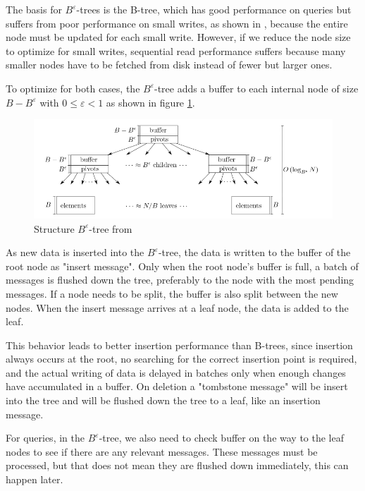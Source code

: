 \documentclass[
	12pt,
	a4paper,
	abstract,
	bibliography=totoc,
	chapterprefix,
	headings=openright,
	numbers=endperiod,
	parskip=half,
	twoside,
]{scrreprt}
\begin{document}
The basis for $B^{\varepsilon}$-trees is the B-tree, which has good performance on queries but suffers from poor performance on small writes, as shown in \cite{bender2015introduction}, 
because the entire node must be updated for each small write.
However, if we reduce the node size to optimize for small writes, sequential read performance suffers because many smaller nodes have to be fetched from disk instead of fewer but larger ones.

To optimize for both cases, the $B^{\varepsilon}$-tree adds a buffer to each internal node of size $B - B^{\varepsilon} $ with $ 0 \leq \varepsilon < 1$ as shown in figure \ref{fig:structure B-epsilon-tree}.

\begin{figure}[ht]
	\centering
	\includegraphics[scale=0.6]{B-epsilon_structure.png}
	\caption{Structure $B^{\varepsilon}$-tree from \cite{bender2015introduction}}
		\label{fig:structure B-epsilon-tree}
\end{figure}

As new data is inserted into the $B^{\varepsilon}$-tree, the data is written to the buffer of the root node as "insert message".
Only when the root node's buffer is full, a batch of messages is flushed down the tree, preferably to the node with the most pending messages. 
If a node needs to be split, the buffer is also split between the new nodes.
When the insert message arrives at a leaf node, the data is added to the leaf.

This behavior leads to better insertion performance than B-trees, since insertion always occurs at the root, no searching for the correct insertion point is required, and  
the actual writing of data is delayed in batches only when enough changes have accumulated in a buffer.
On deletion a "tombstone message" will be insert into the tree and will be flushed down the tree to a leaf, like an insertion message.

For queries, in the $B^{\varepsilon}$-tree, we also need to check buffer on the way to the leaf nodes to see if there are any relevant messages.
These messages must be processed, but that does not mean they are flushed down immediately, this can happen later.
\end{document}
